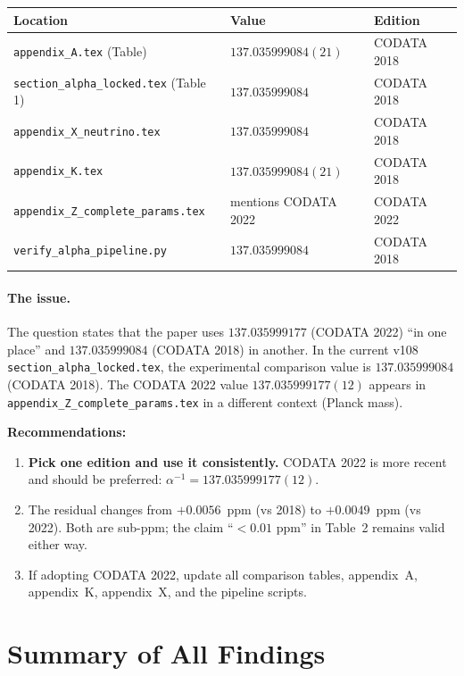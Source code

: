 \documentclass[11pt]{article}
\begin{document}
\begin{center}
\renewcommand{\arraystretch}{1.3}
\begin{tabular}{lll}
\toprule
Location & Value & Edition \\
\midrule
\texttt{appendix\_A.tex} (Table) & $137.035999084(21)$ & CODATA 2018 \\
\texttt{section\_alpha\_locked.tex} (Table 1) & $137.035999084$ & CODATA 2018 \\
\texttt{appendix\_X\_neutrino.tex} & $137.035999084$ & CODATA 2018 \\
\texttt{appendix\_K.tex} & $137.035999084(21)$ & CODATA 2018 \\
\texttt{appendix\_Z\_complete\_params.tex} & mentions CODATA 2022 & CODATA 2022 \\
\texttt{verify\_alpha\_pipeline.py} & $137.035999084$ & CODATA 2018 \\
\bottomrule
\end{tabular}
\end{center}

\paragraph{The issue.}
The question states that the paper uses $137.035999177$ (CODATA 2022) ``in one
place'' and $137.035999084$ (CODATA 2018) in another. In the current v108
\texttt{section\_alpha\_locked.tex}, the experimental comparison value is
$137.035999084$ (CODATA 2018). The CODATA 2022 value $137.035999177(12)$ appears
in \texttt{appendix\_Z\_complete\_params.tex} in a different context (Planck mass).

\textbf{Recommendations:}
\begin{enumerate}
\item \textbf{Pick one edition and use it consistently.} CODATA 2022 is more
  recent and should be preferred: $\alpha^{-1} = 137.035999177(12)$.
\item The residual changes from $+0.0056$~ppm (vs 2018) to $+0.0049$~ppm
  (vs 2022). Both are sub-ppm; the claim ``$< 0.01$ ppm'' in Table~2 remains
  valid either way.
\item If adopting CODATA 2022, update all comparison tables, appendix~A,
  appendix~K, appendix~X, and the pipeline scripts.
\end{enumerate}

\section{Summary of All Findings}
\end{document}
